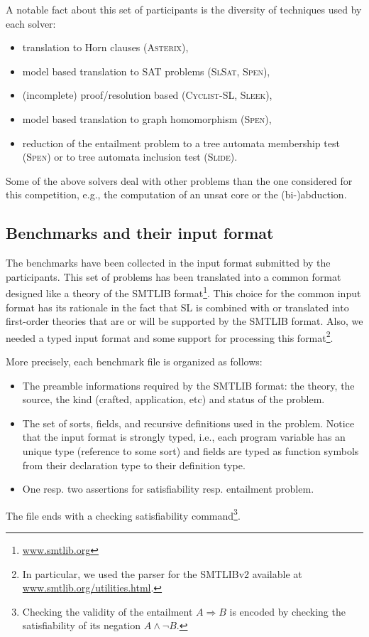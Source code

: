 \documentclass{llncs}
\newcommand{\limp}{\Rightarrow}
\newcommand{\ASTERIX}{\textsc{Asterix}}
\newcommand{\CYCLIST}{\textsc{Cyclist-SL}}
\newcommand{\SLEEK}{\textsc{Sleek}}
\newcommand{\SLIDE}{\textsc{Slide}}
\newcommand{\SLSAT}{\textsc{SlSat}}
\newcommand{\SPEN}{\textsc{Spen}}
\begin{document}
A notable fact about this set of participants is the diversity of techniques used by each solver:
\begin{itemize}
\item translation to Horn clauses (\ASTERIX),
\item model based translation to SAT problems (\SLSAT, \SPEN),
\item (incomplete) proof/resolution based (\CYCLIST, \SLEEK),
\item model based translation to graph homomorphism (\SPEN),
\item reduction of the entailment problem to a tree automata membership test (\SPEN) or to tree automata inclusion test (\SLIDE).
\end{itemize}

Some of the above solvers deal with other problems than the one considered for this competition, e.g., the computation of an unsat core or the (bi-)abduction.


\subsection{Benchmarks and their input format}
The benchmarks have been collected in the input format submitted by the participants.
This set of problems has been translated into a common format designed like a theory of the SMTLIB format\footnote{\url{www.smtlib.org}}. 
This choice for the common input format has its rationale in 
the fact that SL is combined with or translated into first-order theories that are or will be supported by the SMTLIB format.
Also, we needed a typed input format and some support for processing this format\footnote{In particular, we used the parser for the SMTLIBv2 available at \url{www.smtlib.org/utilities.html}.}.
 
More precisely, each benchmark file is organized as follows:
\begin{itemize}
\item The preamble informations required by the SMTLIB format: the theory, the source,  the kind (crafted, application, etc) and status of the problem. 
\item The set of sorts, fields, and recursive definitions used in the problem. Notice that the input format is strongly typed, i.e., each program variable has an unique type (reference to some sort) and 
fields are typed as function symbols from their declaration type to their definition type. 
\item One resp. two assertions for satisfiability resp. entailment problem. 
\end{itemize}
The file ends with a checking satisfiability command\footnote{Checking the validity of the entailment $A\limp B$ is encoded by checking the satisfiability of its negation $A \land \lnot B$.}.
\end{document}
